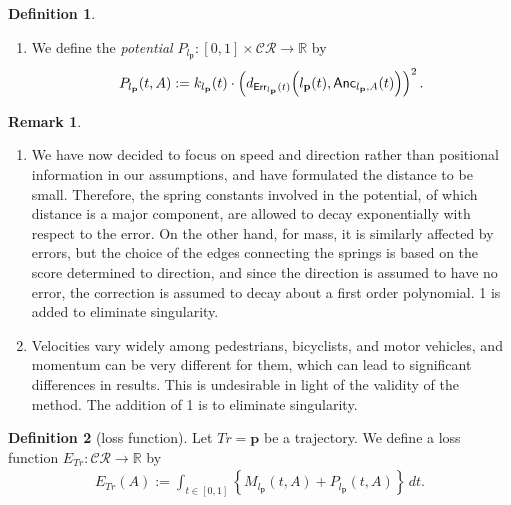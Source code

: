 \documentclass{article}
\numberwithin{equation}{section}
\theoremstyle{definition}
\newtheorem{definition}{Definition}[section]
\newtheorem{remark}[remark]{Remark}
\newcommand{\CR}{\mathcal{CR}}
\newcommand{\err}{\mathsf{Err}}
\newcommand{\R}{\mathbb{R}}
\begin{document}
\begin{definition}
\begin{enumerate}
        \item
        We define the \emph{potential} $P_{l_{\mathbf{p}}}:[0,1]\times\CR\to\R$ by
            \begin{align}
                P_{l_{\mathbf{p}}}(t,A) := k_{l_{\mathbf{p}}}(t)\cdot \left(d_{\err_{l_{\mathbf{p}}}(t)}\Bigl(l_{\mathbf{p}}(t),\mathsf{Anc}_{l_{\mathbf{p}},A}(t)\Bigr)\right)^{2}.
            \end{align}
    \end{enumerate}
    
\end{definition}

\begin{remark}
    \begin{enumerate}
        \item
        We have now decided to focus on speed and direction rather than positional information in our assumptions, and have formulated the distance to be small. Therefore, the spring constants involved in the potential, of which distance is a major component, are allowed to decay exponentially with respect to the error. On the other hand, for mass, it is similarly affected by errors, but the choice of the edges connecting the springs is based on the score determined to direction, and since the direction is assumed to have no error, the correction is assumed to decay about a first order polynomial. 1 is added to eliminate singularity.
        \item
        Velocities vary widely among pedestrians, bicyclists, and motor vehicles, and momentum can be very different for them, which can lead to significant differences in results. This is undesirable in light of the validity of the method. The addition of 1 is to eliminate singularity.
    \end{enumerate}
\end{remark}


\begin{definition}[loss function]
    Let $Tr=\mathbf{p}$ be a trajectory.
    We define a loss function $E_{Tr}:\CR\to\R$ by
    \begin{align}
        E_{Tr}(A) := \int_{t\in[0,1]}\left\{M_{l_{\mathbf{p}}}(t,A)+P_{l_{\mathbf{p}}}(t,A)\right\}\,dt.
    \end{align}
\end{definition}
\end{document}
